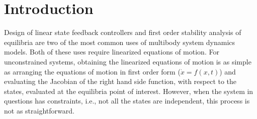 \documentclass[smallcondensed,final]{svjour3}                     %
\begin{document}

\section{Introduction}
\label{sec:intro}
Design of linear state feedback controllers and first order stability analysis
of equilibria are two of the most common uses of multibody system dynamics
models. Both of these uses require linearized equations of motion. For
unconstrained systems, obtaining the linearized equations of motion is as
simple as arranging the equations of motion in first order form ($\dot{x} =
f(x, t)$) and evaluating the Jacobian of the right hand side function, with
respect to the states, evaluated at the equilibria point of interest.  However,
when the system in questions has constraints, i.e., not all the states are
independent, this process is not as straightforward.
\end{document}
